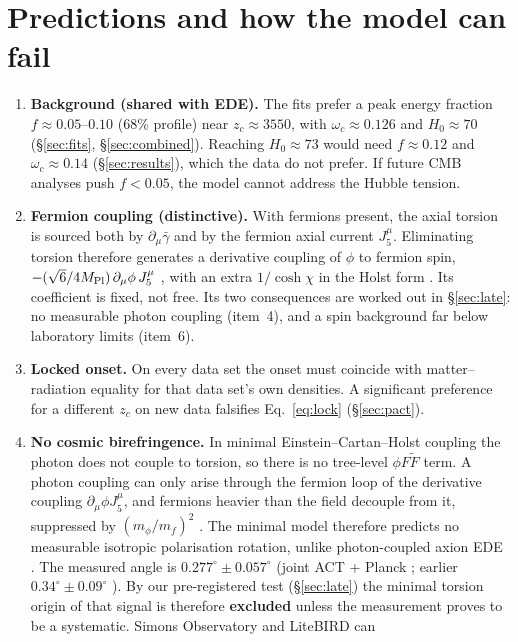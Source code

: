 \documentclass[11pt]{article}
\newcommand{\Mp}{M_{\rm Pl}}
\begin{document}
\section{Predictions and how the model can fail}\label{sec:predictions}
\begin{enumerate}
\item \textbf{Background (shared with EDE).} The fits prefer a peak energy fraction
$f\approx0.05$--$0.10$ (68\% profile) near $z_c\approx3550$, with $\omega_c\approx0.126$ and
$H_0\approx70$ (\S\ref{sec:fits}, \S\ref{sec:combined}). Reaching $H_0\approx73$ would need $f\approx0.12$ and
$\omega_c\approx0.14$ (\S\ref{sec:results}), which the data do not prefer. If future CMB analyses push $f<0.05$,
the model cannot address the Hubble tension.
\item \textbf{Fermion coupling (distinctive).} With fermions present, the axial torsion
is sourced both by $\partial_\mu\bar\gamma$ and by the fermion axial current
$J_5^\mu$. Eliminating torsion therefore generates a derivative coupling of $\phi$ to fermion spin,
$-(\sqrt6/4\Mp)\,\partial_\mu\phi\,J_5^\mu$ \cite{mercuri2009}, with an extra $1/\cosh\chi$ in the Holst form
\cite{torresgomez2009}. Its coefficient is fixed, not free. Its two consequences are worked out in
\S\ref{sec:late}: no measurable photon coupling (item~4), and a spin background far below laboratory limits
(item~6).
\item \textbf{Locked onset.} On every data set the onset must coincide with
matter--radiation equality for that data set's own densities. A significant preference for a
different $z_c$ on new data falsifies Eq.~\eqref{eq:lock} (\S\ref{sec:pact}).
\item \textbf{No cosmic birefringence.} In minimal Einstein--Cartan--Holst coupling the
photon does not couple to torsion, so there is no tree-level $\phi F\tilde F$ term. A
photon coupling can only arise through the fermion loop of the derivative coupling
$\partial_\mu\phi J_5^\mu$, and fermions heavier than the field decouple from it, suppressed by
$(m_\phi/m_f)^2$ \cite{bauer2017,quevillon2019}. The minimal model therefore predicts no
measurable isotropic polarisation rotation, unlike photon-coupled axion EDE
\cite{carroll1998,murai2023,yin2026}. The measured angle is $0.277^\circ\pm0.057^\circ$ (joint ACT + Planck
\cite{eskilt2026}; earlier $0.34^\circ\pm0.09^\circ$ \cite{minami2020,eskilt2022}). By our pre-registered
test (\S\ref{sec:late}) the minimal torsion origin of that signal is therefore \textbf{excluded} unless the
measurement proves to be a systematic. Simons Observatory \cite{so2019} and LiteBIRD \cite{litebird2023} can

\end{enumerate}
\end{document}

